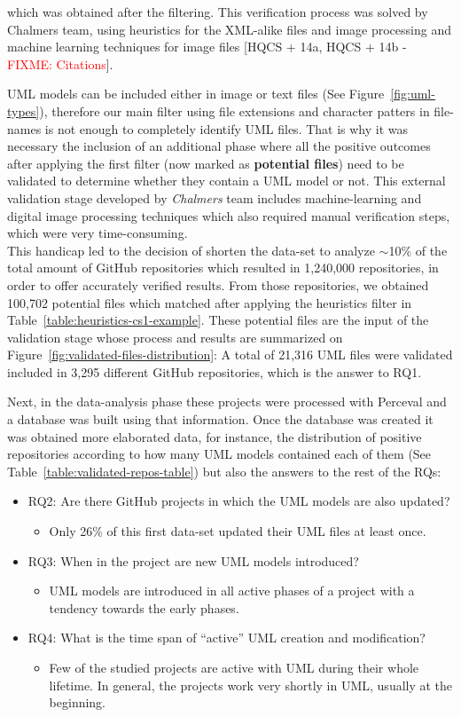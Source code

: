 \documentclass[a4paper, 12pt]{book}
\begin{document}
which was obtained after the filtering. This verification process was solved by Chalmers team, using heuristics for the XML-alike files
and image processing and machine learning techniques for image files [HQCS + 14a, HQCS + 14b - \textcolor{red}{FIXME: Citations}].\par
UML models can be included either in image or text files (See Figure~\ref{fig:uml-types}), therefore our main filter using file extensions
and character patters in file-names is not enough to completely identify UML files. That is why it was necessary the inclusion of
an additional phase where all the positive outcomes after applying the first filter (now marked as \textbf{potential files}) need
to be validated to determine whether they contain a UML model or not. This external validation stage developed by \emph{Chalmers} team
includes machine-learning and digital image processing techniques which also required manual verification steps, which were very time-consuming.\\
This handicap led to the decision of shorten the data-set to analyze $\sim$10\% of the total amount of GitHub repositories which resulted
in 1,240,000 repositories, in order to offer accurately verified results. From those repositories, we obtained 100,702 potential files
which matched after applying the heuristics filter in Table~\ref{table:heuristics-cs1-example}. These potential files are the input
of the validation stage whose process and results are summarized on Figure~\ref{fig:validated-files-distribution}: A total of 21,316 UML
files were validated included in 3,295 different GitHub repositories, which is the answer to RQ1.\par
Next, in the data-analysis phase these projects were processed with Perceval and a database was built using that information.
Once the database was created it was obtained more elaborated data, for instance, the distribution of positive repositories
according to how many UML models contained each of them (See Table~\ref{table:validated-repos-table}) but also the answers to the rest
of the RQs:
\begin{itemize}
  \item RQ2: Are there GitHub projects in which the UML models are also updated?
  \begin{itemize}
    \item Only 26\% of this first data-set updated their UML files at least once.
  \end{itemize}
  \item RQ3: When in the project are new UML models introduced?
  \begin{itemize}
    \item UML models are introduced in all active phases of a project with a tendency towards the early phases.
  \end{itemize}
  \item RQ4: What is the time span of ``active'' UML creation and modification?
  \begin{itemize}
    \item Few of the studied projects are active with UML during their whole lifetime.
    In general, the projects work very shortly in UML, usually at the beginning.
  \end{itemize}
\end{itemize}
\end{document}
